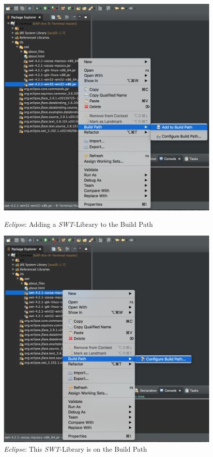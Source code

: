 \documentclass[a4paper, 12pt]{report} %
\begin{document}
\begin{enumerate}
\begin{figure}
\centering	
	\begin{minipage}{0.5\textwidth}
	\centering	
		\captionsetup{width=0.9\linewidth}
		\includegraphics[width=0.9\linewidth]{Bilder/SWT-Add-to-Build-Path}
    	\caption{\textit{Eclipse}: Adding a \textit{SWT}-Library to the Build Path}
    	\label{addToBuildPath}
	\end{minipage}%
	\begin{minipage}{0.5\textwidth}
	\centering
		\captionsetup{width=0.9\linewidth}
    	\includegraphics[width=0.9\linewidth]{Bilder/SWT-Configure-Build-Path}
    	\caption{\textit{Eclipse}: This \textit{SWT}-Library is on the Build Path}
    	\label{onBuildPath}
	\end{minipage}
\end{figure}
		

\end{enumerate}
\end{document}
